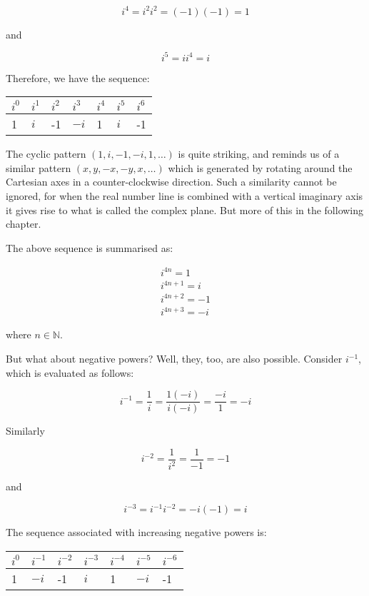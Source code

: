 $$
i^{4}=i^{2} i^{2}=(-1)(-1)=1
$$

and

$$
i^{5}=i i^{4}=i
$$

Therefore, we have the sequence:

\begin{center}
\begin{tabular}{lllllll}
\hline
$i^{0}$ & $i^{1}$ & $i^{2}$ & $i^{3}$ & $i^{4}$ & $i^{5}$ & $i^{6}$ \\
\hline
1 & $i$ & -1 & $-i$ & 1 & $i$ & -1 \\
\hline
\end{tabular}
\end{center}

The cyclic pattern $(1, i,-1,-i, 1, \ldots)$ is quite striking, and reminds us of a similar pattern $(x, y,-x,-y, x, \ldots)$ which is generated by rotating around the Cartesian axes in a counter-clockwise direction. Such a similarity cannot be ignored, for when the real number line is combined with a vertical imaginary axis it gives rise to what is called the complex plane. But more of this in the following chapter.

The above sequence is summarised as:

$$
\begin{gathered}
i^{4 n}=1 \\
i^{4 n+1}=i \\
i^{4 n+2}=-1 \\
i^{4 n+3}=-i
\end{gathered}
$$

where $n \in \mathbb{N}$.

But what about negative powers? Well, they, too, are also possible. Consider $i^{-1}$, which is evaluated as follows:

$$
i^{-1}=\frac{1}{i}=\frac{1(-i)}{i(-i)}=\frac{-i}{1}=-i
$$

Similarly

$$
i^{-2}=\frac{1}{i^{2}}=\frac{1}{-1}=-1
$$

and

$$
i^{-3}=i^{-1} i^{-2}=-i(-1)=i
$$

The sequence associated with increasing negative powers is:

\begin{center}
\begin{tabular}{lllllll}
\hline
$i^{0}$ & $i^{-1}$ & $i^{-2}$ & $i^{-3}$ & $i^{-4}$ & $i^{-5}$ & $i^{-6}$ \\
\hline
1 & $-i$ & -1 & $i$ & 1 & $-i$ & -1 \\
\hline
\end{tabular}
\end{center}

